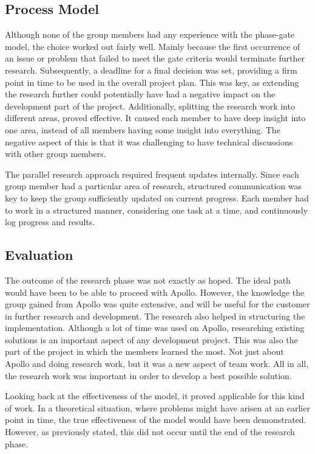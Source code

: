\subsection{Process Model}
\label{subsec:project_evaluation-research_phase-process_model}

Although none of the group members had any experience with the phase-gate model, the choice worked out fairly well. Mainly because the first occurrence of an issue or problem that failed to meet the gate criteria would terminate further research. Subsequently, a deadline for a final decision was set, providing a firm point in time to be used in the overall project plan. This was key, as extending the research further could potentially have had a negative impact on the development part of the project. Additionally, splitting the research work into different areas, proved effective. It caused each member to have deep insight into one area, instead of all members having some insight into everything. The negative aspect of this is that it was challenging to have technical discussions with other group members.

The parallel research approach required frequent updates internally. Since each group member had a particular area of research, structured communication was key to keep the group sufficiently updated on current progress. Each member had to work in a structured manner, considering one task at a time, and continuously log progress and results.

\subsection{Evaluation}
\label{subsec:project_evaluation-research_phase-evaluation}

The outcome of the research phase was not exactly as hoped. The ideal path would have been to be able to proceed with Apollo. However, the knowledge the group gained from Apollo was quite extensive, and will be useful for the customer in further research and development. The research also helped in structuring the implementation. Although a lot of time was used on Apollo, researching existing solutions is an important aspect of any development project. This was also the part of the project in which the members learned the most. Not just about Apollo and doing research work, but it was a new aspect of team work. All in all, the research work was important in order to develop a best possible solution.

Looking back at the effectiveness of the model, it proved applicable for this kind of work. In a theoretical situation, where problems might have arisen at an earlier point in time, the true effectiveness of the model would have been demonstrated. However, as previously stated, this did not occur until the end of the research phase.

